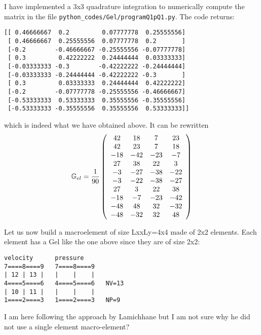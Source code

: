 I have implemented a 3x3 quadrature integration to numerically compute the matrix in the file {\tt python\_codes/Gel/programQ1pQ1.py}.
The code returns:
\begin{verbatim}
[[ 0.46666667  0.2         0.07777778  0.25555556]
 [ 0.46666667  0.25555556  0.07777778  0.2       ]
 [-0.2        -0.46666667 -0.25555556 -0.07777778]
 [ 0.3         0.42222222  0.24444444  0.03333333]
 [-0.03333333 -0.3        -0.42222222 -0.24444444]
 [-0.03333333 -0.24444444 -0.42222222 -0.3       ]
 [ 0.3         0.03333333  0.24444444  0.42222222]
 [-0.2        -0.07777778 -0.25555556 -0.46666667]
 [-0.53333333  0.53333333  0.35555556 -0.35555556]
 [-0.53333333 -0.35555556  0.35555556  0.53333333]]
\end{verbatim}
which is indeed what we have obtained above.
It can be rewritten
\[
{\mathbb{G}}_{el}=
\frac{1}{90}
\left(
\begin{array}{cccc}
 42&  18&   7&  23\\
 42&  23&   7&  18\\
-18& -42& -23&  -7\\
 27&  38&  22&   3\\
 -3& -27& -38& -22\\
 -3& -22& -38& -27\\
 27&   3&  22&  38\\
-18&  -7& -23& -42\\
-48&  48&  32& -32\\
-48& -32&  32&  48
\end{array}
\right) 
\]


Let us now build a macroelement of size LxxLy=4x4 made of 2x2 elements.
Each element has a Gel like the one above since they are of size 2x2:
\begin{verbatim}
velocity      pressure
7====8====9   7====8====9
| 12 | 13 |   |    |    |
4====5====6   4====5====6   NV=13
| 10 | 11 |   |    |    |   
1====2====3   1====2====3   NP=9
\end{verbatim}

I am here following the approach by Lamichhane \cite{lami17}
but I am not sure why he did not use a single element macro-element?

